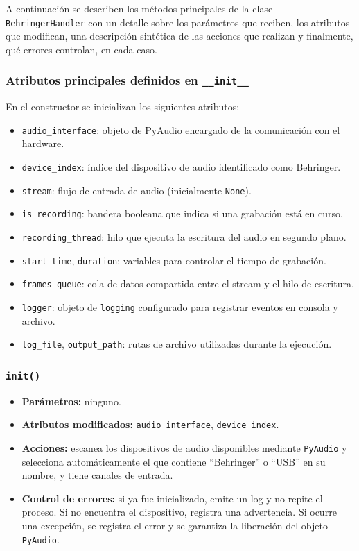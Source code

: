 A continuación se describen los métodos principales de la clase \texttt{BehringerHandler} con un detalle sobre los parámetros que reciben, los atributos que modifican, una descripción sintética de las acciones que realizan y finalmente, qué errores controlan, en cada caso.

\subsubsection*{Atributos principales definidos en \texttt{\_\_init\_\_}}

En el constructor se inicializan los siguientes atributos:

\begin{itemize}
    \item \texttt{audio\_interface}: objeto de PyAudio encargado de la comunicación con el hardware.
    \item \texttt{device\_index}: índice del dispositivo de audio identificado como Behringer.
    \item \texttt{stream}: flujo de entrada de audio (inicialmente \texttt{None}).
    \item \texttt{is\_recording}: bandera booleana que indica si una grabación está en curso.
    \item \texttt{recording\_thread}: hilo que ejecuta la escritura del audio en segundo plano.
    \item \texttt{start\_time}, \texttt{duration}: variables para controlar el tiempo de grabación.
    \item \texttt{frames\_queue}: cola de datos compartida entre el stream y el hilo de escritura.
    \item \texttt{logger}: objeto de \texttt{logging} configurado para registrar eventos en consola y archivo.
    \item \texttt{log\_file}, \texttt{output\_path}: rutas de archivo utilizadas durante la ejecución.
\end{itemize}

\subsubsection*{\texttt{init()}}

\begin{itemize}
    \item \textbf{Parámetros:} ninguno.
    \item \textbf{Atributos modificados:} \texttt{audio\_interface}, \texttt{device\_index}.
    \item \textbf{Acciones:} escanea los dispositivos de audio disponibles mediante \texttt{PyAudio} y selecciona automáticamente el que contiene ``Behringer'' o ``USB'' en su nombre, y tiene canales de entrada.
    \item \textbf{Control de errores:} si ya fue inicializado, emite un log y no repite el proceso. Si no encuentra el dispositivo, registra una advertencia. Si ocurre una excepción, se registra el error y se garantiza la liberación del objeto \texttt{PyAudio}.
\end{itemize}

